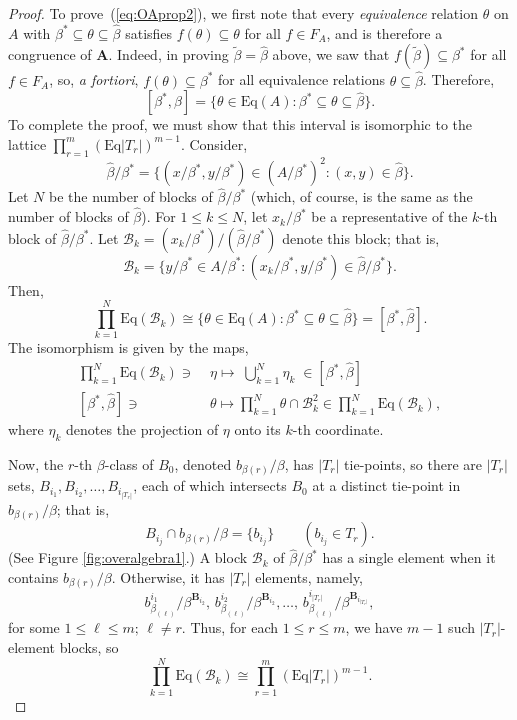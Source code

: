 \documentclass[cm,dissertation,actual,final]{uhthesis}
\theoremstyle{plain}
\theoremstyle{definition}
\theoremstyle{remark}
\numberwithin{theorem}{section}
\numberwithin{claim}{chapter}
\numberwithin{equation}{section}
\numberwithin{conjecture}{chapter}
\newcommand{\<}{\ensuremath{\langle}}
\renewcommand{\>}{\ensuremath{\rangle}}
\renewcommand{\leq}{\ensuremath{\leqslant}}
\newcommand{\Eq}{\ensuremath{\mathrm{Eq}}}
\newcommand{\0}{\ensuremath{\mathbf{0}}}
\newcommand{\1}{\ensuremath{\mathbf{1}}}
\newcommand{\2}{\ensuremath{\mathbf{2}}}
\newcommand{\3}{\ensuremath{\mathbf{3}}}
\newcommand{\4}{\ensuremath{\mathbf{4}}}
\newcommand{\5}{\ensuremath{\mathbf{5}}}
\newcommand{\bA}{\ensuremath{\mathbf{A}}}
\newcommand{\bB}{\ensuremath{\mathbf{B}}}
\newcommand{\sB}{\ensuremath{\mathscr{B}}}
\newcommand{\tbeta}{\ensuremath{\widetilde{\beta}}}
\begin{document}
\begin{proof}
  To prove~(\ref{eq:OAprop2}),
  we first note that every \emph{equivalence} relation $\theta$ on $A$ with
  $\beta^* \subseteq \theta \subseteq \widehat{\beta}$ satisfies 
  $f(\theta)\subseteq \theta$ for all $f\in F_A$, and is therefore a congruence of
  $\bA$. Indeed, in proving $\tbeta= \widehat{\beta}$ above,
  we saw that $f(\tbeta)\subseteq \beta^*$ for all $f\in F_A$, so,
  {\it a fortiori}, $f(\theta)\subseteq \beta^*$ for all equivalence relations  
  $\theta \subseteq \widehat{\beta}$. 
  Therefore, 
  \[
    [\beta^*, \widehat{\beta}] = 
    \{\theta \in \Eq(A) : \beta^* \subseteq \theta \subseteq \widehat{\beta} \}.
    \]
    To complete the proof, we must show that this interval is isomorphic to the lattice 
    $\prod_{r=1}^m (\Eq |T_r|)^{m-1}$.
    Consider,
    \[
    \widehat{\beta}/\beta^* = \{(x/\beta^*, y/\beta^*) \in (A/\beta^*)^2 : (x,y) \in \widehat{\beta}\}.
    \]
    Let $N$ be the number of blocks of $\widehat{\beta}/\beta^*$ (which, of course, is the
    same as the number of blocks of $\widehat{\beta}$). For $1\leq k \leq N$, let
    $x_k/\beta^*$ be a representative of the $k$-th block of $\widehat{\beta}/\beta^*$.  Let
    $\sB_k = (x_k/\beta^*)/(\widehat{\beta}/\beta^*)$ denote this block; that is,
    \[
    \sB_k = \{y/\beta^* \in A/\beta^* : (x_k/\beta^*, y/\beta^*) \in
    \widehat{\beta}/\beta^*\}.
    \]
    Then,
    \[
    \prod_{k=1}^N \Eq(\sB_k) \cong \{ \theta \in \Eq(A) : \beta^* \subseteq \theta
    \subseteq \widehat{\beta} \} = [\beta^*, \widehat{\beta}].
    \]
    The isomorphism is given by the maps,
    \begin{align*}
      \prod_{k=1}^N \Eq(\sB_k) \ni \; & \eta \mapsto \; \bigcup_{k=1}^N \eta_k \; \in [\beta^*, \widehat{\beta}]\\
           [\beta^*, \widehat{\beta}] \ni \;  & \theta \mapsto \prod_{k=1}^N \theta \cap \sB_k^2 \in \prod_{k=1}^N \Eq(\sB_k),
    \end{align*}
    where $\eta_k$ denotes the projection of $\eta$ onto its $k$-th coordinate.

    Now, the $r$-th $\beta$-class of $B_0$, denoted $b_{\beta(r)}/\beta$, has $|T_r|$
    tie-points, so there are $|T_r|$ sets, $B_{i_1}, B_{i_2}, \dots, B_{i_{|T_r|}}$,
    each of which intersects $B_0$ at a distinct tie-point in $b_{\beta(r)}/\beta$;
    that is,
    \[
    B_{i_{j}} \cap b_{\beta(r)}/\beta = \{b_{i_j}\} \qquad (b_{i_j} \in T_r).
    \]
    (See Figure \ref{fig:overalgebra1}.) 
    A block $\sB_k$ of $\widehat{\beta}/\beta^*$ has a single element when it contains 
    $b_{\beta(r)}/\beta$.  Otherwise, it has $|T_r|$ elements, namely,
    \[
    b^{i_1}_{\beta_{(\ell)}}/\beta^{\bB_{i_2}}, \,
    b^{i_2}_{\beta_{(\ell)}}/\beta^{\bB_{i_2}}, \dots, \, b^{i_{|T_r|}}_{\beta_{(\ell)}}/\beta^{\bB_{i_{|T_r|}}},
    \]
    for some $1\leq \ell \leq m; \, \ell \neq r$.  Thus, for each $1\leq r \leq m$, we
    have $m-1$ such $|T_r|$-element blocks, so
    \[
    \prod_{k=1}^N \Eq(\sB_k) \cong 
    \prod_{r=1}^m (\Eq |T_r|)^{m-1}.
    \]

\end{proof}
\end{document}
